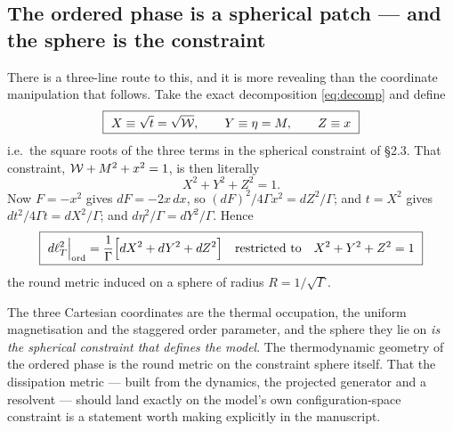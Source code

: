 \subsection{The ordered phase is a spherical patch --- and the sphere is the constraint}
\label{sec:sphere}
There is a three-line route to this, and it is more revealing than the coordinate
manipulation that follows. Take the exact decomposition \eqref{eq:decomp} and define
\begin{equation}
  \boxed{\ X\equiv\sqrt{t}=\sqrt{\mathcal{W}},\qquad Y\equiv\eta=M,\qquad Z\equiv x\ }
  \label{eq:XYZ}
\end{equation}
i.e.\ the square roots of the three terms in the spherical constraint of \S2.3. That
constraint, $\mathcal{W}+M^{2}+x^{2}=1$, is then literally
\begin{equation}
  X^{2}+Y^{2}+Z^{2}=1 .
\end{equation}
Now $F=-x^{2}$ gives $dF=-2x\,dx$, so $(dF)^{2}/4\Gamma x^{2}=dZ^{2}/\Gamma$; and
$t=X^{2}$ gives $dt^{2}/4\Gamma t=dX^{2}/\Gamma$; and $d\eta^{2}/\Gamma=dY^{2}/\Gamma$.
Hence
\begin{equation}
  \boxed{\ d\ell_T^{2}\Big|_{\rm ord}=\frac{1}{\Gamma}\Big[dX^{2}+dY^{2}+dZ^{2}\Big]
   \quad\text{restricted to}\quad X^{2}+Y^{2}+Z^{2}=1\ }
  \label{eq:sphereXYZ}
\end{equation}
the round metric induced on a sphere of radius $R=1/\sqrt\Gamma$.

 The three Cartesian coordinates are the thermal
occupation, the uniform magnetisation and the staggered order parameter, and the sphere they
lie on \emph{is the spherical constraint that defines the model}. The thermodynamic geometry
of the ordered phase is the round metric on the constraint sphere itself. That the
dissipation metric --- built from the dynamics, the projected generator and a resolvent ---
should land exactly on the model's own configuration-space constraint is a statement worth
making explicitly in the manuscript.

